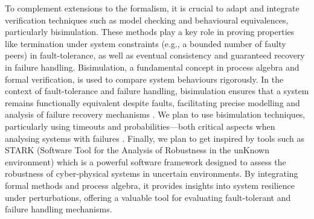 \documentclass{article}
\theoremstyle{definition}
\theoremstyle{definition}
\begin{document}
To complement extensions to the formalism, it is crucial to adapt and integrate verification techniques such as model checking \cite{DBLP:conf/ictac/PetersWN19, DBLP:journals/lmcs/PetersNW23} and behavioural equivalences, particularly bisimulation. These methods play a key role in proving properties like termination under system constraints (e.g., a bounded number of faulty peers) in fault-tolerance, as well as eventual consistency and guaranteed recovery in failure handling.
Bisimulation, a fundamental concept in process algebra and formal verification, is used to compare system behaviours rigorously. In the context of fault-tolerance and failure handling, bisimulation ensures that a system remains functionally equivalent despite faults, facilitating precise modelling and analysis of failure recovery mechanisms \cite{FRANCALANZA200722}. 
We plan to use  bisimulation techniques, particularly using timeouts and probabilities—both critical aspects when analysing systems with failures \cite{reghem_et_al:LIPIcs.CONCUR.2024.36,DBLP:journals/lmcs/Glabbeek21,LANOTTE2021104618}. Finally, we plan to get inspired by tools such as  STARK  (Software Tool for the Analysis of Robustness in the unKnown environment) \cite{CASTIGLIONI2024103134} which is a powerful software framework designed to assess the robustness of cyber-physical systems in uncertain environments. By integrating formal methods and process algebra, it provides insights into system resilience under perturbations, offering a valuable tool for evaluating fault-tolerant and failure handling mechanisms.





\end{document}
